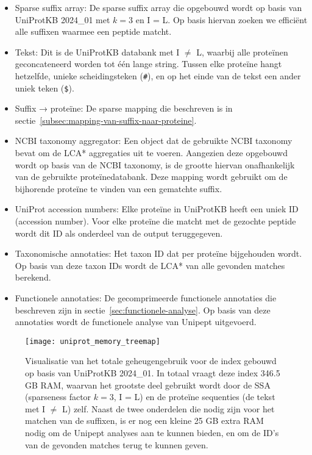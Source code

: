\begin{itemize}
    \item Sparse suffix array: De sparse suffix array die opgebouwd wordt op basis van UniProtKB 2024\_01 met $k = 3$ en I = L\@.
    Op basis hiervan zoeken we efficiënt alle suffixen waarmee een peptide matcht.
    \item Tekst: Dit is de UniProtKB databank met I $\neq$ L, waarbij alle proteïnen geconcateneerd worden tot één lange string.
    Tussen elke proteïne hangt hetzelfde, unieke scheidingsteken (\texttt{\#}), en op het einde van de tekst een ander uniek teken (\texttt{\$}).
    \item Suffix → proteïne: De sparse mapping die beschreven is in sectie~\ref{subsec:mapping-van-suffix-naar-proteine}.
    \item NCBI taxonomy aggregator: Een object dat de gebruikte NCBI taxonomy bevat om de LCA* aggregaties uit te voeren.
    Aangezien deze opgebouwd wordt op basis van de NCBI taxonomy, is de grootte hiervan onafhankelijk van de gebruikte proteïnedatabank.
    Deze mapping wordt gebruikt om de bijhorende proteïne te vinden van een gematchte suffix.
    \item UniProt accession numbers: Elke proteïne in UniProtKB heeft een uniek ID (accession number).
    Voor elke proteïne die matcht met de gezochte peptide wordt dit ID als onderdeel van de output teruggegeven.
    \item Taxonomische annotaties: Het taxon ID dat per proteïne bijgehouden wordt.
    Op basis van deze taxon IDs wordt de LCA* van alle gevonden matches berekend.
    \item Functionele annotaties: De gecomprimeerde functionele annotaties die beschreven zijn in sectie~\ref{sec:functionele-analyse}.
    Op basis van deze annotaties wordt de functionele analyse van Unipept uitgevoerd.
\end{itemize}

\begin{figure}[h]
    \centering
    \texttt{[image: uniprot\_memory\_treemap]}
    \caption{Visualisatie van het totale geheugengebruik voor de index gebouwd op basis van UniProtKB 2024\_01.
    In totaal vraagt deze index 346.5 GB RAM, waarvan het grootste deel gebruikt wordt door de SSA (sparseness factor $k = 3$, I = L) en de proteïne sequenties (de tekst met I $\neq$ L) zelf.
    Naast de twee onderdelen die nodig zijn voor het matchen van de suffixen, is er nog een kleine 25 GB extra RAM nodig om de Unipept analyses aan te kunnen bieden, en om de ID's van de gevonden matches terug te kunnen geven.}
    \label{fig:uniprot_memory_treemap}
\end{figure}
\newpage
